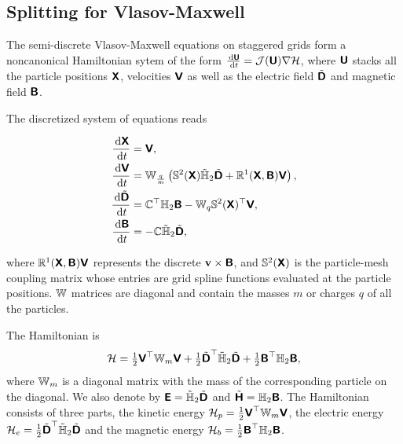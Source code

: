 \documentclass[11pt]{article}
\begin{document}

\subsection{Splitting for Vlasov-Maxwell}
\label{sec:splitting_vlasovmaxwell}

The semi-discrete Vlasov-Maxwell equations on staggered grids form a noncanonical Hamiltonian sytem of the form $\fract{\arrU}{t}=\mathcal{J}(\arrU)\nabla\cH$, where $\arrU$ stacks all
the particle positions $\arrX$, velocities $\arrV$ as well as the electric field $\tilde\arrD$ and magnetic field $\arrB$.

The discretized system of equations reads

\begin{equation}
    \begin{aligned}
        \fract{\arrX}{t}       & = \arrV,                                                                                                   \\
        \fract{\arrV}{t}       & = \matW_{\frac{q}{m}} \left( \matS^2(\arrX)\hodgeDualTwo \tilde\arrD + \matR^1(\arrX, \arrB) \arrV\right), \\
        \fract{\tilde\arrD}{t} & = \matC^\top \hodgeTwo \arrB - \matW_q \matS^2(\arrX)^\top \arrV,                                          \\
        \fract{\arrB}{t}       & = -\matC \hodgeDualTwo \tilde\arrD,
    \end{aligned}
\end{equation}

where $\matR^1(\arrX, \arrB) \arrV$ represents the discrete $\bf{v} \times \arrB$, and $\matS^2(\arrX)$ is the particle-mesh coupling matrix whose entries are grid spline functions evaluated at the particle positions. $\matW$ matrices are diagonal and contain the masses $m$ or charges $q$ of all the particles.

The Hamiltonian is
\begin{equation}
    \cH =   \tfrac 12 \arrV^\top \matW_m \arrV + \tfrac 12 \tilde\arrD^\top  \hodgeDualTwo \tilde\arrD + \tfrac 12 \arrB^\top \hodgeTwo \arrB,
\end{equation}
where $\matW_m$ is a diagonal matrix with the mass of the corresponding particle on the diagonal. We also denote by $\arrE =  \hodgeDualTwo \tilde\arrD$ and $\tilde{\arrH}=\hodgeTwo \arrB$.
The Hamiltonian consists of three parts, the kinetic energy $\cH_p = \tfrac 12 \arrV^\top \matW_m \arrV$, the electric energy $\cH_e = \tfrac 12 \tilde\arrD^\top  \hodgeDualTwo \tilde\arrD$
and the magnetic energy $\cH_b= \tfrac 12 \arrB^\top \hodgeTwo \arrB$.
\end{document}
